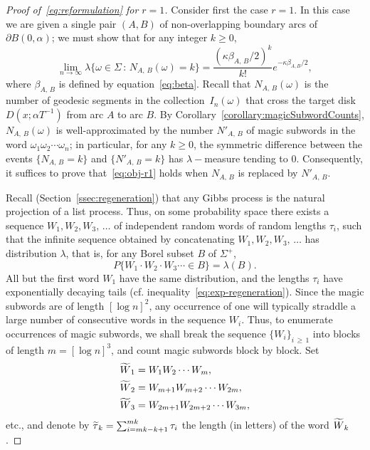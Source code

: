 \documentclass[10pt]{amsart}
\theoremstyle{definition}\newtheorem{defi}[theo]{Definition}\newtheorem{rema}[theo]{Remark}\newtheorem{exam}[theo]{Example}\newtheorem{exem}[theo]{Example}\newtheorem{nota}[theo]{Notation}
\let\oldtilde\tilde
\renewcommand*{\tilde}[1]{\mathchoice{\widetilde{#1}}{\widetilde{#1}}{\oldtilde{#1}}{\oldtilde{#1}}}\let\oldforall\forall
\renewcommand*{\forall}{\mathrel{\oldforall}}
\begin{document}
\begin{proof}[Proof of~\eqref{eq:reformulation} for $r= 1$]
Consider first the case $r=1$. In this case we are given a single pair $(A,B)$ of non-overlapping boundary arcs of $\partial B (0,\alpha)$; we must show that for any integer $k\geq 0$,
\begin{equation}\label{eq:obj-r1}
\lim_{n \rightarrow \infty} \lambda \{\omega \in \Sigma \,:\, N_{A,\,B} (\omega)=k\} = \frac{(\kappa \beta_{A,\,B}/2)^{k}}{k!} e^{- \kappa \beta_{A,B}/2},
\end{equation}
where $\beta_{A,\,B}$ is defined by equation~\eqref{eq:beta}. Recall that $N_{A,\,B} (\omega)$ is the number of geodesic segments in the collection~$I_{n} (\omega)$ that cross the target disk $D(x;\alpha T^{-1})$ from arc $A$ to arc $B$. By Corollary~\ref{corollary:magicSubwordCounts}, $N_{A,\,B} (\omega)$ is well-approximated by the number $N'_{A,\,B}$ of magic subwords in the word $\omega_{1}\omega_{2}\dotsb \omega_{n}$; in particular, for any $k\geq 0$, the symmetric difference between the events $\{N_{A,\,B}=k \}$ and $\{N'_{A,\,B} =k\}$ has $\lambda -$measure tending to $0$. Consequently, it suffices to prove that~\eqref{eq:obj-r1} holds when $N_{A,\,B}$ is replaced by $N'_{A,\,B}$.

Recall (Section~\ref{ssec:regeneration}) that any Gibbs process is the natural projection of a list process. Thus, on some probability space there exists a sequence $W_{1},W_{2},W_{3},\,\dotsc$ of independent random words of random lengths $\tau_{i}$, such that the infinite sequence obtained by concatenating $W_{1},W_{2},W_{3},\,\dotsc$ has distribution $\lambda$, that is, for any Borel subset $B$ of $\Sigma^{+}$,
\[
P\{W_{1}\cdot W_{2} \cdot W_{3} \dotsb \in B\}=\lambda (B).
\]
All but the first word $W_{1}$ have the same distribution, and the lengths $\tau_{i}$ have exponentially decaying tails (cf. inequality~\eqref{eq:exp-regeneration}). Since the magic subwords are of length $[\log n]^{2}$, any occurrence of one will typically straddle a large number of consecutive words in the sequence $W_{i}$. Thus, to enumerate occurrences of magic subwords, we shall break the sequence $\{W_{i} \}_{i\,\geq\,1}$ into blocks of length $m=[\log n]^{3}$, and count magic subwords block by block. Set
\begin{align*}
\tilde{W}_{1}&=W_{1}W_{2}\dotsb W_{m},\\
\tilde{W}_{2}&=W_{m+1}W_{m+2}\dotsb W_{2m},\\
\tilde{W}_{3}&=W_{2m+1}W_{2m+2}\dotsb W_{3m},
\end{align*}
etc., and denote by $\tilde{\tau}_{k}=\sum_{i=mk-k+1}^{mk}\tau_{i}$ the length (in letters) of the word $\tilde{W}_{k}$.


\end{proof}
\end{document}
